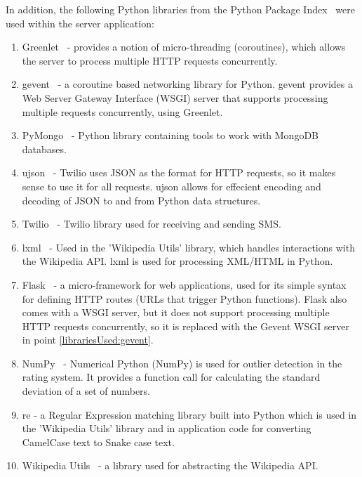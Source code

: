 \documentclass[authoryearcitations]{UoYCSproject}
\begin{document}
In addition, the following Python libraries from the Python Package Index~\cite{pypi} were used within the server application:
\begin{enumerate}
    \item Greenlet~\cite{libraryGreenlet} - provides a notion of micro-threading (coroutines), which allows the server to process multiple HTTP requests concurrently.
    \item gevent~\cite{libraryGevent} \label{librariesUsed:gevent} - a coroutine based networking library for Python. gevent provides a Web Server Gateway Interface (WSGI) server that supports processing multiple requests concurrently, using Greenlet.
    \item PyMongo~\cite{libraryPyMongo} - Python library containing tools to work with MongoDB databases.
    \item ujson~\cite{libraryUjson} - Twilio uses JSON as the format for HTTP requests, so it makes sense to use it for all requests. ujson allows for effecient encoding and decoding of JSON to and from Python data structures.
    \item Twilio~\cite{libraryTwilio2} - Twilio library used for receiving and sending SMS.
    \item lxml~\cite{libraryLxml} - Used in the 'Wikipedia Utils' library, which handles interactions with the Wikipedia API. lxml is used for processing XML/HTML in Python.
    \item Flask~\cite{libraryFlask} - a micro-framework for web applications, used for its simple syntax for defining HTTP routes (URLs that trigger Python functions). Flask also comes with a WSGI server, but it does not support processing multiple HTTP requests concurrently, so it is replaced with the Gevent WSGI server in point \ref{librariesUsed:gevent}.
    \item NumPy~\cite{libraryNumPy} - Numerical Python (NumPy) is used for outlier detection in the rating system. It provides a function call for calculating the standard deviation of a set of numbers.
    \item re - a Regular Expression matching library built into Python which is used in the 'Wikipedia Utils' library and in application code for converting CamelCase text to Snake case text.
    \item Wikipedia Utils~\cite{libraryWikipediaUtils} - a library used for abstracting the Wikipedia API.
\end{enumerate}
\end{document}
